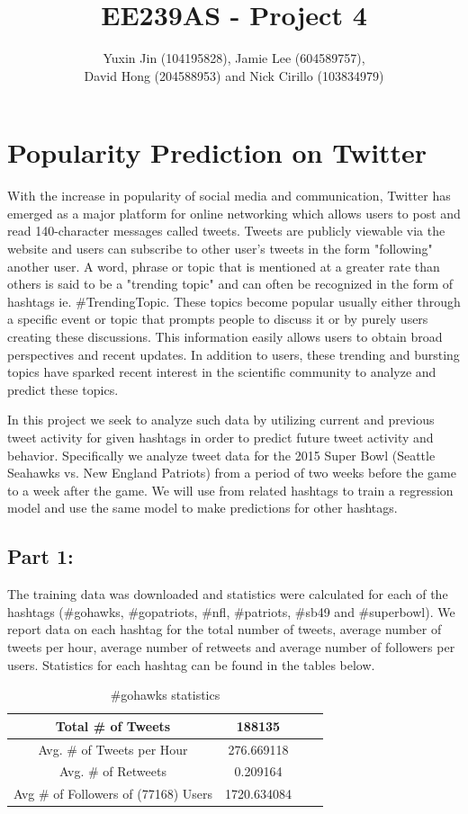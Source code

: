 \documentclass[12pt]{article}
\title{EE239AS - Project 4}
\author{Yuxin Jin (104195828), Jamie Lee (604589757),\\ David Hong (204588953) and Nick Cirillo (103834979)}
\begin{document}
\maketitle


\section{Popularity Prediction on Twitter}

With the increase in popularity of social media and communication, Twitter has emerged as a major platform for online networking which allows users to post and read 140-character messages called tweets. Tweets are publicly viewable via the website and users can subscribe to other user's tweets in the form "following" another user. A word, phrase or topic that is mentioned at a greater rate than others is said to be a "trending topic" and can often be recognized in the form of hashtags ie. \#TrendingTopic. These topics  become popular usually either through a specific event or topic that prompts people to discuss it or by purely users creating these discussions. This information easily allows users to obtain broad perspectives and recent updates. In addition to users, these trending and bursting topics have sparked recent interest in the scientific community to analyze and predict these topics.

In this project we seek to analyze such data by utilizing current and previous tweet activity for given hashtags in order to predict future tweet activity and behavior. Specifically we analyze tweet data for the 2015 Super Bowl (Seattle Seahawks vs. New England Patriots) from a period of two weeks before the game to a week after the game. We will use from related hashtags to train a regression model and use the same model to make predictions for other hashtags.


\subsection{Part 1:}

The training data was downloaded and statistics were calculated for each of the hashtags (\#gohawks, \#gopatriots, \#nfl, \#patriots, \#sb49 and \#superbowl). We report data on each hashtag for the total number of tweets, average number of tweets per hour, average number of retweets and average number of followers per users. Statistics for each hashtag can be found in the tables below.

\begin{table}[!h]
	\centering
	\begin{tabular}{| c | c | c | c |}
		\hline 
		Total \# of Tweets & 188135 \\\hline
		Avg. \# of Tweets per Hour & 276.669118 \\\hline
		Avg. \# of Retweets & 0.209164 \\\hline
		Avg \# of Followers of (77168) Users & 1720.634084 \\\hline
	\end{tabular} 
	\caption{\#gohawks statistics}
	\label{part1:tab1}
\end{table} 
\end{document}
